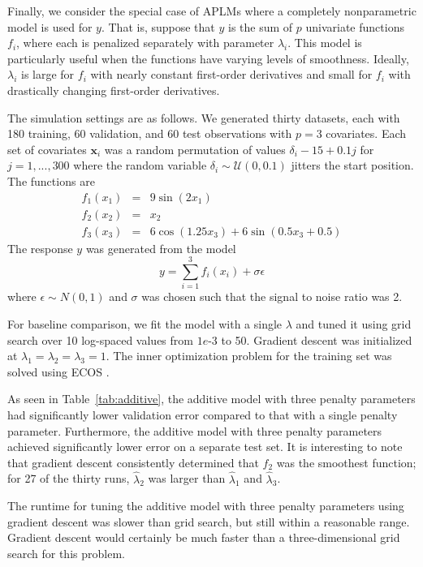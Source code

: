\documentclass{statsoc}
\begin{document}
Finally, we consider the special case of APLMs where a completely nonparametric model is used for $y$. That is, suppose that $y$ is the sum of $p$ univariate functions $f_i$, where each is penalized separately with parameter $\lambda_i$. This model is particularly useful when the functions have varying levels of smoothness. Ideally, $\lambda_i$ is large for $f_i$ with nearly constant first-order derivatives and small for $f_i$ with drastically changing first-order derivatives. 

The simulation settings are as follows. We generated thirty datasets, each with 180 training, 60 validation, and 60 test observations with $p=3$ covariates. Each set of covariates $\boldsymbol{x}_i$ was a random permutation of values $\delta_i - 15 + 0.1 j$ for $j=1,...,300$ where the random variable $\delta_i \sim \mathcal{U}(0, 0.1)$ jitters the start position. The functions are 
\begin{equation}
\begin{array}{ccl}
f_1(x_1) &=& 9 \sin(2x_1)\\
f_2(x_2) &=& x_2 \\
f_3(x_3) &=& 6 \cos(1.25 x_3) + 6 \sin(0.5 x_3 + 0.5)
\end{array}
\end{equation}
The response $y$ was generated from the model 
\begin{equation}
y=\sum _{i=1}^3 f_i(x_i) + \sigma \epsilon
\end{equation}
where $\epsilon \sim N(0, 1)$ and $\sigma$ was chosen such that the signal to noise ratio was 2.

For baseline comparison, we fit the model with a single $\lambda$ and tuned it using grid search over 10 log-spaced values from $1e$-3 to 50. Gradient descent was initialized at $\lambda_1=\lambda_2=\lambda_3=1$. The inner optimization problem for the training set was solved using ECOS \citep{Domahidi2013ecos}.

As seen in Table~\ref{tab:additive}, the additive model with three penalty parameters had significantly lower validation error compared to that with a single penalty parameter. Furthermore, the additive model with three penalty parameters achieved significantly lower error on a separate test set. It is interesting to note that gradient descent consistently determined that $f_2$ was the smoothest function; for 27 of the thirty runs, $\hat{\lambda}_2$ was larger than $\hat{\lambda}_1$ and $\hat{\lambda}_3$.

The runtime for tuning the additive model with three penalty parameters using gradient descent was slower than grid search, but still within a reasonable range. Gradient descent would certainly be much faster than a three-dimensional grid search for this problem.
\end{document}
